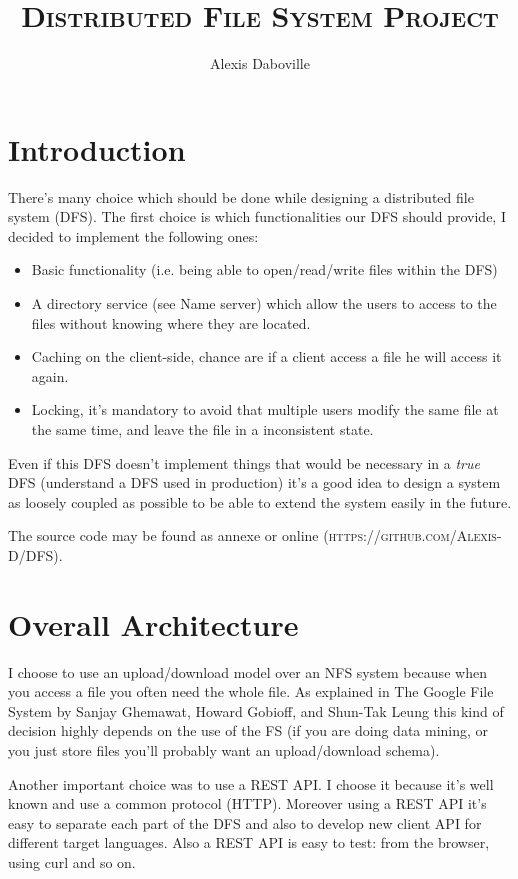 \documentclass[12pt,a4paper]{report}
\author{Alexis Daboville}
\title{\textsc{Distributed File System Project}}
\begin{document}
	\maketitle
	
	\section*{Introduction}

		There's many choice which should be done while designing a distributed file system (DFS). The first choice is which functionalities our DFS should provide, I decided to implement the following ones:
		\begin{itemize}
			\item Basic functionality (i.e. being able to open/read/write files within the DFS)
			\item A directory service (see Name server) which allow the users to access to the files without knowing where they are located.
			\item Caching on the client-side, chance are if a client access a file he will access it again.
			\item Locking, it's mandatory to avoid that multiple users modify the same file at the same time, and leave the file in a inconsistent state.
		\end{itemize}

		Even if this DFS doesn't implement things that would be necessary in a \emph{true} DFS (understand a DFS used in production) it's a good idea to design a system as loosely coupled as possible to be able to extend the system easily in the future.
		
		The source code may be found as annexe or online (\textsc{https://github.com/Alexis-D/DFS}).

	\section*{Overall Architecture}
	
		I choose to use an upload/download model over an NFS system because when you access a file you often need the whole file. As explained in The Google File System by Sanjay Ghemawat, Howard Gobioff, and Shun-Tak Leung this kind of decision highly depends on the use of the FS (if you are doing data mining, or you just store files you'll probably want an upload/download schema).
		
		Another important choice was to use a REST API. I choose it because it's well known and use a common protocol (HTTP). Moreover using a REST API it's easy to separate each part of the DFS and also to develop new client API for different target languages. Also a REST API is easy to test: from the browser, using curl and so on.
		
\end{document}
